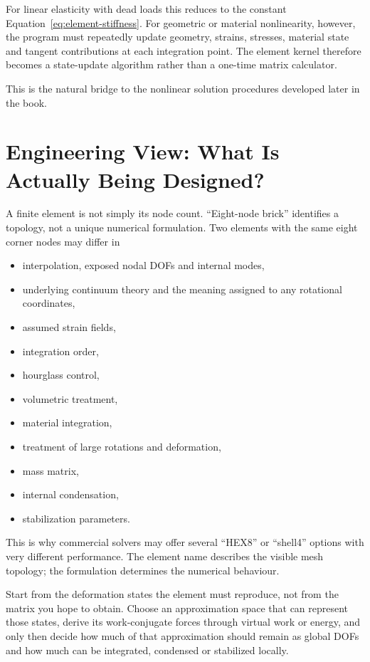 For linear elasticity with dead loads this reduces to the constant
Equation~\eqref{eq:element-stiffness}. For geometric or material nonlinearity,
however, the program must repeatedly update geometry, strains, stresses,
material state and tangent contributions at each integration point. The element
kernel therefore becomes a state-update algorithm rather than a one-time matrix
calculator.

This is the natural bridge to the nonlinear solution procedures developed later
in the book.

\section{Engineering View: What Is Actually Being Designed?}

A finite element is not simply its node count. ``Eight-node brick'' identifies a
topology, not a unique numerical formulation. Two elements with the same eight
corner nodes may differ in

\begin{itemize}
    \item interpolation, exposed nodal DOFs and internal modes,
    \item underlying continuum theory and the meaning assigned to any rotational coordinates,
    \item assumed strain fields,
    \item integration order,
    \item hourglass control,
    \item volumetric treatment,
    \item material integration,
    \item treatment of large rotations and deformation,
    \item mass matrix,
    \item internal condensation,
    \item stabilization parameters.
\end{itemize}

This is why commercial solvers may offer several ``HEX8'' or ``shell4'' options
with very different performance. The element name describes the visible mesh
topology; the formulation determines the numerical behaviour.

\begin{notebooknote}

Start from the deformation states the element must reproduce, not from the
matrix you hope to obtain. Choose an approximation space that can represent
those states, derive its work-conjugate forces through virtual work or energy,
and only then decide how much of that approximation should remain as global
DOFs and how much can be integrated, condensed or stabilized locally.
\end{notebooknote}


